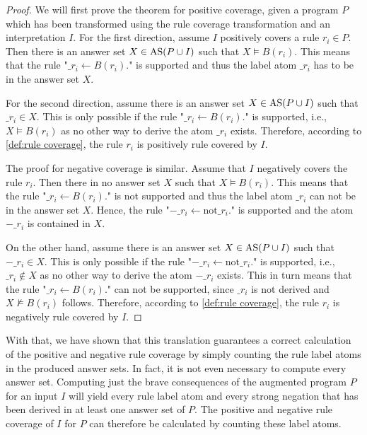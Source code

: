 \begin{proof}
\label{pr:rule transformation}
    We will first prove the theorem for positive coverage, given a program $P$ which has been transformed using the rule coverage transformation and an interpretation $I$. For the first direction, assume $I$ positively covers a rule \(r_i \in P\). Then there is an answer set \(X \in \operatorname{AS}(P \cup I)\) such that \(X \models B(r_i)\). This means that the rule "\(\_r_i \leftarrow B(r_i).\)" is supported and thus the label atom $\_r_i$ has to be in the answer set $X$. 
    
    For the second direction, assume there is an answer set \(X \in \operatorname{AS}(P \cup I)\) such that \(\_r_i \in X\). This is only possible if the rule "\(\_r_i \leftarrow B(r_i).\)" is supported, i.e., \(X \models B(r_i)\) as no other way to derive the atom $\_r_i$ exists. Therefore, according to \cref{def:rule coverage}, the rule $r_i$ is positively rule covered by $I$.

    The proof for negative coverage is similar. Assume that $I$ negatively covers the rule $r_i$. Then there in no answer set $X$ such that \(X \models B(r_i)\). This means that the rule "\(\_r_i \leftarrow B(r_i).\)" is not supported and thus the label atom $\_r_i$ can not be in the answer set $X$. Hence, the rule "\(-\_r_i \leftarrow \text{not} \_r_i.\)" is supported and the atom $-\_r_i$ is contained in $X$.

    On the other hand, assume there is an answer set \(X \in \operatorname{AS}(P \cup I)\) such that \(-\_r_i \in X\). This is only possible if the rule "\(-\_r_i \leftarrow \text{not} \_r_i.\)" is supported, i.e., \(\_r_i \not\in X\) as no other way to derive the atom $-\_r_i$ exists. This in turn means that the rule "\(\_r_i \leftarrow B(r_i).\)" can not be supported, since $\_r_i$ is not derived and \(X \not\models B(r_i)\) follows. Therefore, according to \cref{def:rule coverage}, the rule $r_i$ is negatively rule covered by $I$.
\end{proof}

With that, we have shown that this translation guarantees a correct calculation of the positive and negative rule coverage by simply counting the rule label atoms in the produced answer sets. In fact, it is not even necessary to compute every answer set. Computing just the brave consequences of the augmented program $P$ for an input $I$ will yield every rule label atom and every strong negation that has been derived in at least one answer set of $P$. The positive and negative rule coverage of $I$ for $P$ can therefore be calculated by counting these label atoms. 

